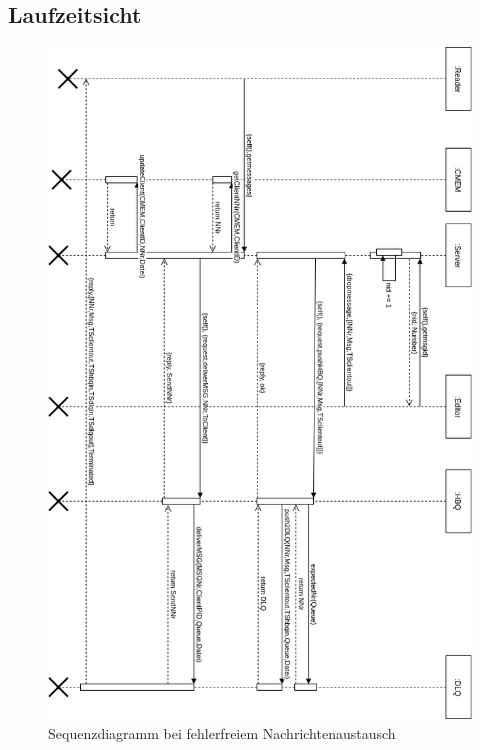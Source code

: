\documentclass{article}
\begin{document}
\subsection{Laufzeitsicht}
\begin{figure}[H]
\centering
\includegraphics[width=\textwidth]{sequence-diagram.png}
\caption[seq-dia]{Sequenzdiagramm bei fehlerfreiem Nachrichtenaustausch}
\label{fig:sequence-diagram}
\end{figure}
\end{document}
